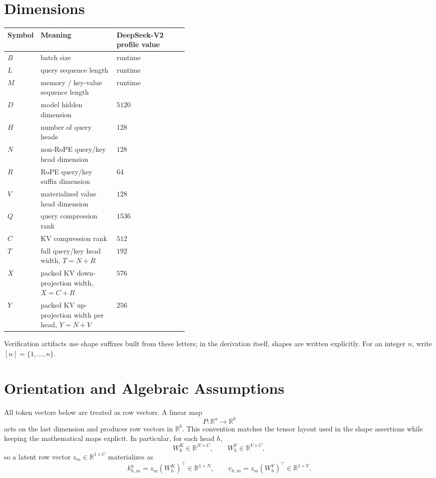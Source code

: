 \documentclass[11pt]{article}
\newcommand{\R}{\mathbb{R}}
\begin{document}
\section{Dimensions}

\begin{center}
\small
\begin{tabular}{@{}lp{0.42\linewidth}l@{}}
\toprule
Symbol & Meaning & DeepSeek-V2 profile value \\
\midrule
$B$ & batch size & runtime \\
$L$ & query sequence length & runtime \\
$M$ & memory / key-value sequence length & runtime \\
$D$ & model hidden dimension & $5120$ \\
$H$ & number of query heads & $128$ \\
$N$ & non-RoPE query/key head dimension & $128$ \\
$R$ & RoPE query/key suffix dimension & $64$ \\
$V$ & materialized value head dimension & $128$ \\
$Q$ & query compression rank & $1536$ \\
$C$ & KV compression rank & $512$ \\
$T$ & full query/key head width, $T=N+R$ & $192$ \\
$X$ & packed KV down-projection width, $X=C+R$ & $576$ \\
$Y$ & packed KV up-projection width per head, $Y=N+V$ & $256$ \\
\bottomrule
\end{tabular}
\end{center}

Verification artifacts use shape suffixes built from these letters; in the
derivation itself, shapes are written explicitly.
For an integer $n$, write $[n]=\{1,\ldots,n\}$.

\section{Orientation and Algebraic Assumptions}

All token vectors below are treated as row vectors.  A linear map
\[
  P:\R^a\to\R^b
\]
acts on the last dimension and produces row vectors in $\R^b$.  This convention
matches the tensor layout used in the shape assertions while keeping the
mathematical maps explicit.  In particular, for each head $h$,
\[
  W^K_h\in\R^{N\times C},
  \qquad
  W^V_h\in\R^{V\times C},
\]
so a latent row vector $z_m\in\R^{1\times C}$ materializes as
\[
  k^{\mathrm n}_{h,m}=z_m(W^K_h)^\top\in\R^{1\times N},
  \qquad
  v_{h,m}=z_m(W^V_h)^\top\in\R^{1\times V}.
\]
\end{document}
